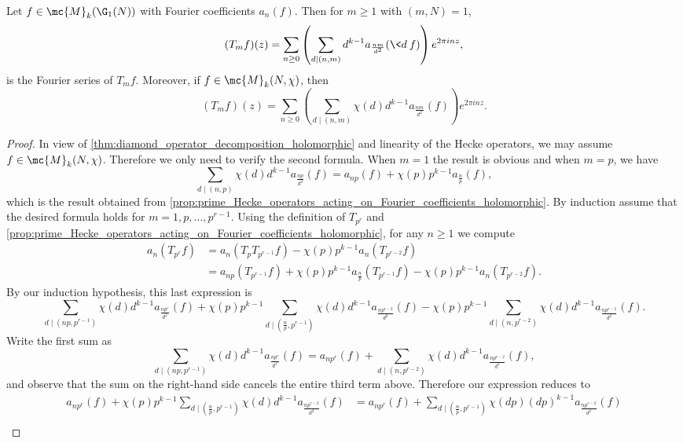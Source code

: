     \begin{proposition}\label{prop:general_Hecke_operators_acting_on_Fourier_coefficients_holomorphic}
      Let $f \in \mc{M}_{k}(\G_{1}(N))$ with Fourier coefficients $a_{n}(f)$. Then for $m \ge 1$ with $(m,N) = 1$,
      \[
        (T_{m}f)(z) = \sum_{n \ge 0}\left(\sum_{d \mid (n,m)}d^{k-1}a_{\frac{nm}{d^{2}}}(\<d\>f)\right)e^{2\pi inz},
      \]
      is the Fourier series of $T_{m}f$. Moreover, if $f \in \mc{M}_{k}(N,\chi)$, then
      \[
        (T_{m}f)(z) = \sum_{n \ge 0}\left(\sum_{d \mid (n,m)}\chi(d)d^{k-1}a_{\frac{nm}{d^{2}}}(f)\right)e^{2\pi inz}.
      \]
    \end{proposition}
    \begin{proof}
      In view of \cref{thm:diamond_operator_decomposition_holomorphic} and linearity of the Hecke operators, we may assume $f \in \mc{M}_{k}(N,\chi)$. Therefore we only need to verify the second formula. When $m = 1$ the result is obvious and when $m = p$, we have
      \[
        \sum_{d \mid (n,p)}\chi(d)d^{k-1}a_{\frac{np}{d^{2}}}(f) = a_{np}(f)+\chi(p)p^{k-1}a_{\frac{n}{p}}(f),
      \]
      which is the result obtained from \cref{prop:prime_Hecke_operators_acting_on_Fourier_coefficients_holomorphic}. By induction assume that the desired formula holds for $m = 1,p,\ldots,p^{r-1}$. Using the definition of $T_{p^{r}}$ and \cref{prop:prime_Hecke_operators_acting_on_Fourier_coefficients_holomorphic}, for any $n \ge 1$ we compute
      \begin{align*}
        a_{n}(T_{p^{r}}f) &= a_{n}(T_{p}T_{p^{r-1}}f)-\chi(p)p^{k-1}a_{n}(T_{p^{r-2}}f) \\
        &= a_{np}(T_{p^{r-1}}f)+\chi(p)p^{k-1}a_{\frac{n}{p}}(T_{p^{r-1}}f)-\chi(p)p^{k-1}a_{n}(T_{p^{r-2}}f).
      \end{align*}
      By our induction hypothesis, this last expression is
      \[
        \sum_{d \mid (np,p^{r-1})}\chi(d)d^{k-1}a_{\frac{np^{r}}{d^{2}}}(f)+\chi(p)p^{k-1}\sum_{d \mid \left(\frac{n}{p},p^{r-1}\right)}\chi(d)d^{k-1}a_{\frac{np^{r-2}}{d^{2}}}(f)-\chi(p)p^{k-1}\sum_{d \mid (n,p^{r-2})}\chi(d)d^{k-1}a_{\frac{np^{r-2}}{d^{2}}}(f).
      \]
      Write the first sum as
      \[
        \sum_{d \mid (np,p^{r-1})}\chi(d)d^{k-1}a_{\frac{np^{r}}{d^{2}}}(f) = a_{np^{r}}(f)+\sum_{d \mid (n,p^{r-2})}\chi(d)d^{k-1}a_{\frac{np^{r-2}}{d^{2}}}(f),
      \]
      and observe that the sum on the right-hand side cancels the entire third term above. Therefore our expression reduces to
      \begin{align*}
        a_{np^{r}}(f)+\chi(p)p^{k-1}\sum_{d \mid \left(\frac{n}{p},p^{r-1}\right)}\chi(d)d^{k-1}a_{\frac{np^{r-2}}{d^{2}}}(f) &= a_{np^{r}}(f)+\sum_{d \mid \left(\frac{n}{p},p^{r-1}\right)}\chi(dp)(dp)^{k-1}a_{\frac{np^{r-2}}{d^{2}}}(f) \\

\end{align*}
\end{proof}
